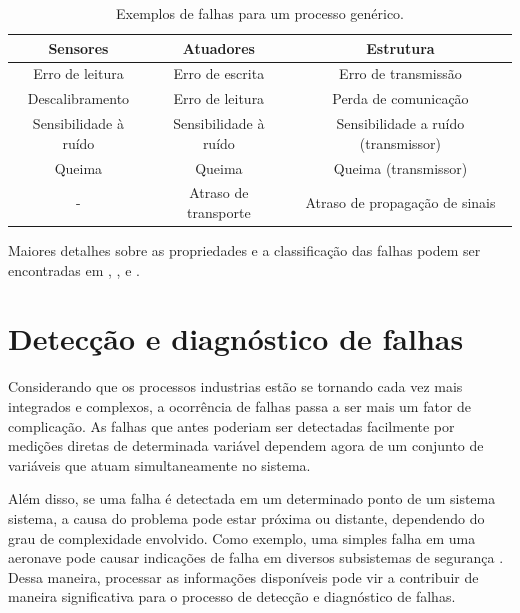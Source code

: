\begin{table}[htb]
\centering
\caption{Exemplos de falhas para um processo genérico.}
\label{tab:falhas}
\vspace{0.25cm}
\begin{tabular}{|c|c|c|}
\hline
{\bf Sensores} & {\bf Atuadores} & {\bf Estrutura}\\
\hline
\hline
Erro de leitura & Erro de escrita & Erro de transmissão\\
\hline
Descalibramento & Erro de leitura & Perda de comunicação\\
\hline
Sensibilidade à ruído & Sensibilidade à ruído & Sensibilidade a ruído
(transmissor)\\
\hline
Queima & Queima & Queima (transmissor)\\
\hline
- & Atraso de transporte & Atraso de propagação de sinais\\
\hline
\end{tabular}
\end{table}

Maiores detalhes sobre as propriedades e a classificação das falhas podem ser
encontradas em , ,
 e .


\section{Detecção e diagnóstico de falhas}
Considerando que os processos industrias estão se tornando cada vez mais integrados e
complexos, a ocorrência de falhas passa a ser mais um fator de complicação. As
falhas que antes poderiam ser detectadas facilmente por medições diretas de
determinada variável dependem agora de um conjunto de variáveis que atuam
simultaneamente no sistema. 

Além disso, se uma falha é detectada em um determinado ponto de um sistema
sistema, a causa do problema pode estar próxima ou distante, dependendo do grau
de complexidade envolvido. Como exemplo, uma simples falha em uma aeronave pode
causar indicações de falha em diversos subsistemas de segurança
\cite{vach:2006}. Dessa maneira, processar as informações disponíveis pode vir a
contribuir de maneira significativa para o processo de detecção e diagnóstico de
falhas.

